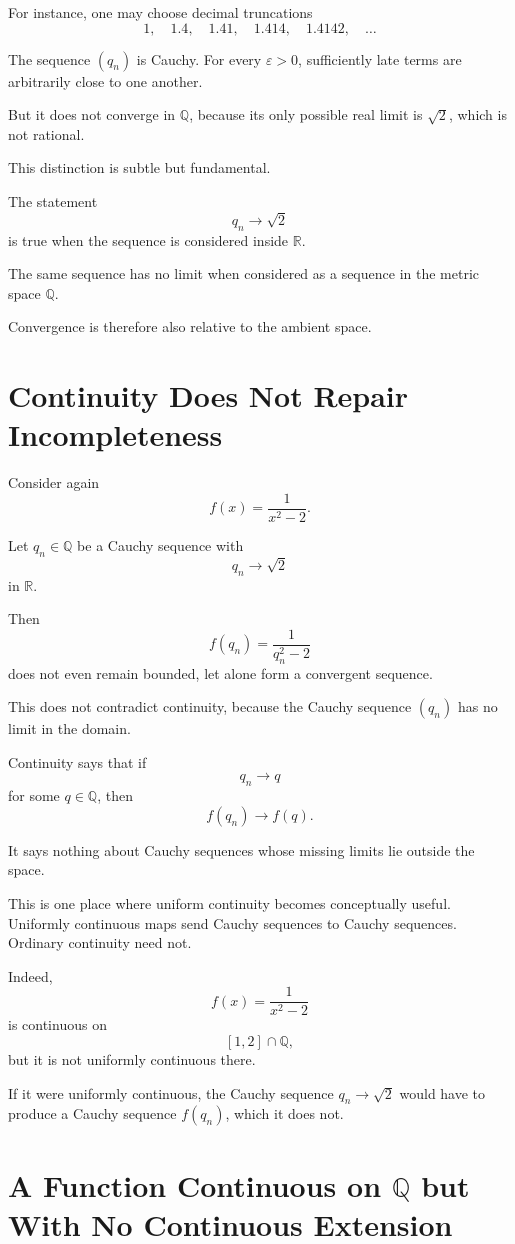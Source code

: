 \documentclass{essay}
\begin{document}
For instance, one may choose decimal truncations
\[
1,\quad
1.4,\quad
1.41,\quad
1.414,\quad
1.4142,\quad\ldots
\]

The sequence \((q_n)\) is Cauchy. For every \(\varepsilon>0\), sufficiently
late terms are arbitrarily close to one another.

But it does not converge in \(\mathbb{Q}\), because its only possible real
limit is \(\sqrt{2}\), which is not rational.

This distinction is subtle but fundamental.

The statement
\[
q_n\to\sqrt{2}
\]
is true when the sequence is considered inside \(\mathbb{R}\).

The same sequence has no limit when considered as a sequence in the metric
space \(\mathbb{Q}\).

Convergence is therefore also relative to the ambient space.

\section{Continuity Does Not Repair Incompleteness}

Consider again
\[
f(x)=\frac{1}{x^2-2}.
\]

Let \(q_n\in\mathbb{Q}\) be a Cauchy sequence with
\[
q_n\to\sqrt{2}
\]
in \(\mathbb{R}\).

Then
\[
f(q_n)=\frac{1}{q_n^2-2}
\]
does not even remain bounded, let alone form a convergent sequence.

This does not contradict continuity, because the Cauchy sequence
\((q_n)\) has no limit in the domain.

Continuity says that if
\[
q_n\to q
\]
for some \(q\in\mathbb{Q}\), then
\[
f(q_n)\to f(q).
\]

It says nothing about Cauchy sequences whose missing limits lie outside the
space.

This is one place where uniform continuity becomes conceptually useful.
Uniformly continuous maps send Cauchy sequences to Cauchy sequences. Ordinary
continuity need not.

Indeed,
\[
f(x)=\frac{1}{x^2-2}
\]
is continuous on
\[
[1,2]\cap\mathbb{Q},
\]
but it is not uniformly continuous there.

If it were uniformly continuous, the Cauchy sequence
\(q_n\to\sqrt{2}\) would have to produce a Cauchy sequence \(f(q_n)\), which it
does not.

\section{A Function Continuous on \(\mathbb{Q}\) but With No Continuous Extension}
\end{document}
